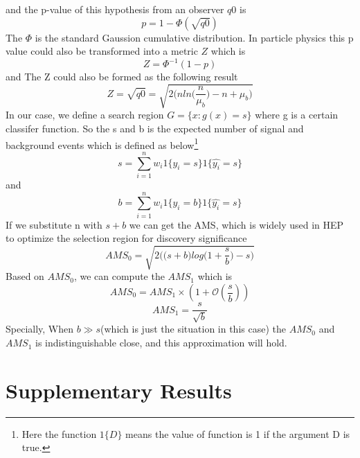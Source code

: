 \documentclass[11pt]{article}
\begin{document}
and the p-value of this hypothesis from an observer $q0$ is $$p=1-\Phi(\sqrt{q0})$$
The $\Phi$ is the standard Gaussion cumulative distribution. In particle physics this p value could also be transformed into a metric $Z$ which is $$Z=\Phi^{-1}(1-p)$$ and The Z could also be formed as the following result$$Z=\sqrt{q0}=\sqrt{2\bigg(nln\big(\frac{n}{\mu_{b}}\big)-n+\mu_{b})}$$ 
In our case, we define a search region $G=\{x:g(x)=s\}$ where g is a certain classifer function. So the s and b is the expected number of signal and background events which is defined as below\footnote{Here the function $1\{D\}$ means the value of function is 1 if the argument D is true.} $$s=\sum^{n}_{i=1}w_{i}1\{y_{i}=s\}1\{\hat{y_{i}}=s\}$$ and  $$b=\sum^{n}_{i=1}w_{i}1\{y_{i}=b\}1\{\hat{y_{i}}=s\}$$
If we substitute n with $s+b$ we can get the AMS, which is widely used in HEP to optimize the selection region for discovery significance $$AMS_{0}=\sqrt{2\bigg(\big(s+b\big)log\big(1+\frac{s}{b}\big)-s\bigg)}$$ 
Based on $AMS_{0}$, we can compute the $AMS_{1}$ which is $$AMS_{0}=AMS_{1} \times (1+\mathcal{O}(\frac{s}{b}))$$
$$AMS_{1}=\frac{s}{\sqrt{b}}$$
Specially, When $b\gg s$(which is just the situation in this case) the $AMS_{0}$ and $AMS_{1}$ is indistinguishable close, and this approximation will hold.\\


\clearpage
\section*{Supplementary Results}

\vspace{40pt}
\end{document}
